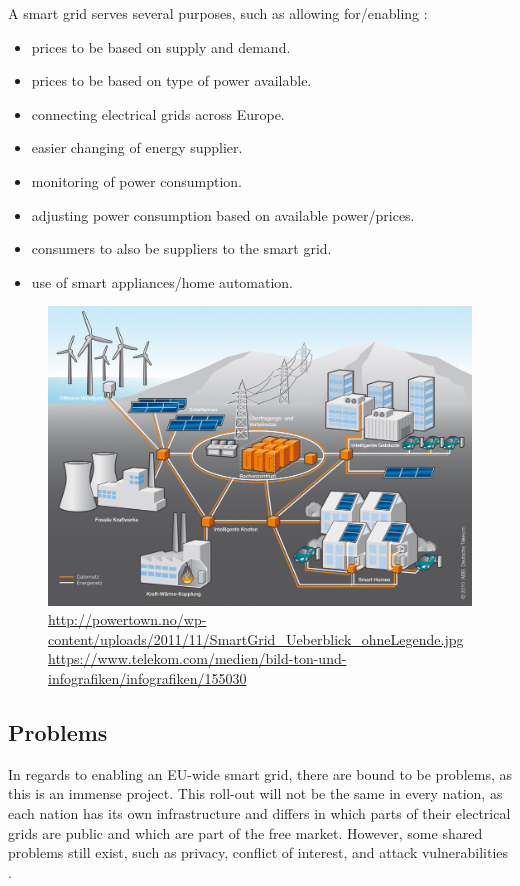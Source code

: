 A smart grid serves several purposes, such as allowing for/enabling \cite{smartgrid_gov} \cite{directive_2009_72_EC}:
\begin{itemize}
	\item prices to be based on supply and demand.
	\item prices to be based on type of power available.
	\item connecting electrical grids across Europe.
	\item easier changing of energy supplier.
	\item monitoring of power consumption.
	\item adjusting power consumption based on available power/prices.
	\item consumers to also be suppliers to the smart grid.
	\item use of smart appliances/home automation.
\end{itemize}

\begin{figure}
	\includegraphics[width=\textwidth]{figures/SmartGrid_Ueberblick_ohneLegende.jpg}
	\caption{\url{http://powertown.no/wp-content/uploads/2011/11/SmartGrid_Ueberblick_ohneLegende.jpg} \url{https://www.telekom.com/medien/bild-ton-und-infografiken/infografiken/155030}
	}
	\label{fig:background:smartgrid}
\end{figure}

\subsection{Problems}
In regards to enabling an EU-wide smart grid, there are bound to be problems, as this is an immense project.
This roll-out will not be the same in every nation, as each nation has its own infrastructure and differs in which parts of their electrical grids are public and which are part of the free market.
However, some shared problems still exist, such as privacy, conflict of interest, and attack vulnerabilities \cite{offswitch} \cite{smart_meter_survey} \cite{security_economics}.

